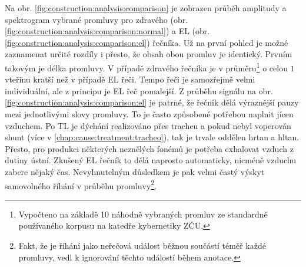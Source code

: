 Na obr. \ref{fig:construction:analysis:comparison} je zobrazen průběh amplitudy a spektrogram vybrané promluvy pro zdravého (obr. \ref{fig:construction:analysis:comparison:normal}) a EL (obr. \ref{fig:construction:analysis:comparison:el}) řečníka. Už na první pohled je možné zaznamenat určité rozdíly i přesto, že obsah obou promluv je identický. Prvním takovým je délka promluvy. V případě zdravého řečníka je v průměru\footnote{Vypočteno na základě 10 náhodně vybraných promluv ze standardně používaného korpusu na katedře kybernetiky ZČU.} o celou $1$ vteřinu kratší než v případě EL řeči. Tempo řeči je samozřejmě velmi individuální, ale z principu je EL řeč pomalejší. Z průběhu signálu na obr. \ref{fig:construction:analysis:comparison:el} je patrné, že řečník dělá výraznější pauzy mezi jednotlivými slovy promluvy. To je často způsobené potřebou naplnit jícen vzduchem. Po TL je dýchání realizováno přes tracheu a pokud nebyl voperován shunt (více v \ref{chap:cause:treatment:tracheo}), tak je trvale oddělen hrtan a hltan. Přesto, pro produkci některých neznělých fonémů je potřeba exhalovat vzduch z dutiny ústní. Zkušený EL řečník to dělá naprosto automaticky, nicméně  vzduchu zabere nějaký čas. Nevyhnutelným důsledkem je pak velmi častý výskyt samovolného říhání v průběhu promluvy\footnote{Fakt, že je říhání jako neřečová událost běžnou součástí téměř každé promluvy, vedl k ignorování těchto událostí během anotace.}.

